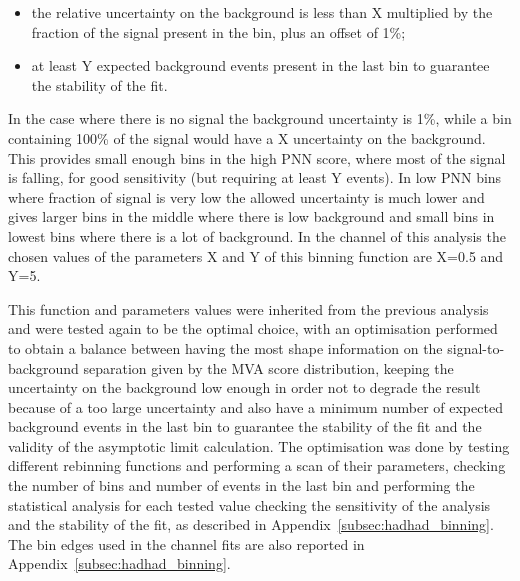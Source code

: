 \begin{itemize}
\item the relative uncertainty on the background is less than X multiplied by the fraction of the signal present in the bin, plus an offset of 1\%; 
\item at least Y expected background events present in the last bin to guarantee the stability of the fit. 
\end{itemize}

In the case where there is no signal the background uncertainty is 1\%, while a bin containing 100\% of the signal would have a X uncertainty on the background. This provides small enough bins in the high PNN score, where most of the signal is falling, for good sensitivity (but requiring at least Y events). In low PNN bins where fraction of signal is very low the allowed uncertainty is much lower and gives larger bins in the middle where there is low background and small bins in lowest bins where there is a lot of background. In the \hadhad channel of this analysis the chosen values of the parameters X and Y of this binning function are X=0.5 and Y=5.

This function and parameters values were inherited from the previous analysis~\cite{HIGG-2016-16} and were tested again to be the optimal choice, with an optimisation performed to obtain a balance between having the most shape information on the signal-to-background separation given by the MVA score distribution, keeping the uncertainty on the background low enough in order not to degrade the result because of a too large uncertainty and also have a minimum number of expected background events in the last bin to guarantee the stability of the fit and the validity of the asymptotic limit calculation. The optimisation was done by testing different rebinning functions and performing a scan of their parameters, checking the number of bins and number of events in the last bin and performing the statistical analysis for each tested value checking the sensitivity of the analysis and the stability of the fit, as described in Appendix~\ref{subsec:hadhad_binning}. The bin edges used in the \hadhad channel fits are also reported in Appendix~\ref{subsec:hadhad_binning}.

